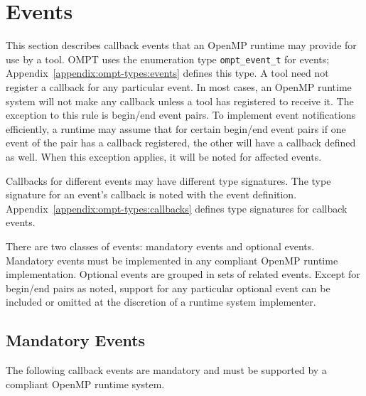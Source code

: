 \documentclass{article}
\newcommand{\descheader}[1]{{\needspace{3\baselineskip}\vspace{1em}\noindent \fbox{#1}}}
\begin{document}
\section{Events}
\label{sec:events} 

This section describes callback events that an OpenMP runtime 
may provide for use by a tool. OMPT uses the enumeration type \verb|ompt_event_t| for events; 
Appendix~\ref{appendix:ompt-types:events} defines this type. 
A tool need not register a callback for any particular event.
In most cases, an OpenMP runtime system will not make any callback unless a  tool has registered to receive it. The exception to this rule is begin/end event pairs. 
To implement event notifications efficiently, a runtime may assume that for certain begin/end event pairs if one event of the pair has a callback registered, the other will have a callback defined as well. When this exception applies, it will be noted for affected events.

Callbacks for different events may have different type signatures. 
The type signature for an event's callback is noted with the event definition.  Appendix~\ref{appendix:ompt-types:callbacks} defines type signatures for callback events.


There are two classes of events: mandatory events and optional events.
Mandatory events must be implemented in any compliant OpenMP runtime implementation. 
Optional events are grouped in sets of related events. Except for begin/end pairs as noted, support for any particular optional event can be included or omitted at the 
discretion of a runtime system implementer. 


\subsection{Mandatory Events}

 The following callback events are mandatory and must be supported by a compliant OpenMP 
 runtime system. 

\descheader{Threads}
\end{document}
